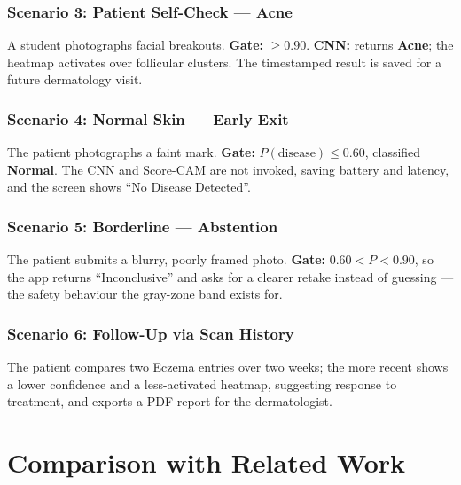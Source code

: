 \subsubsection{Scenario 3: Patient Self-Check — Acne}
A student photographs facial breakouts. \textbf{Gate:} $\ge0.90$. \textbf{CNN:}
returns \textbf{Acne}; the heatmap activates over follicular clusters. The
timestamped result is saved for a future dermatology visit.

\subsubsection{Scenario 4: Normal Skin — Early Exit}
The patient photographs a faint mark. \textbf{Gate:} $P(\text{disease}) \le 0.60$,
classified \textbf{Normal}. The CNN and Score-CAM are not invoked, saving battery
and latency, and the screen shows ``No Disease Detected''.

\subsubsection{Scenario 5: Borderline — Abstention}
The patient submits a blurry, poorly framed photo. \textbf{Gate:}
$0.60 < P < 0.90$, so the app returns ``Inconclusive'' and asks for a clearer
retake instead of guessing — the safety behaviour the gray-zone band exists for.

\subsubsection{Scenario 6: Follow-Up via Scan History}
The patient compares two Eczema entries over two weeks; the more recent shows a
lower confidence and a less-activated heatmap, suggesting response to treatment,
and exports a PDF report for the dermatologist.

\section{Comparison with Related Work}


